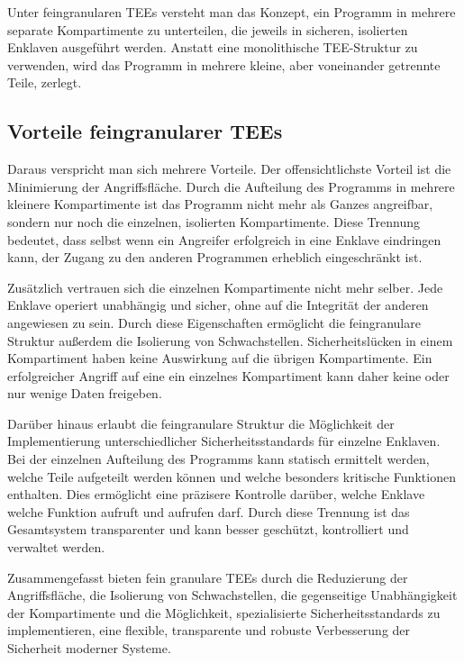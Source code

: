 Unter feingranularen TEEs versteht man das Konzept, ein Programm in mehrere separate Kompartimente zu unterteilen, die jeweils in sicheren, isolierten Enklaven ausgeführt werden. Anstatt eine monolithische TEE-Struktur zu verwenden, wird das Programm in mehrere kleine, aber voneinander getrennte Teile, zerlegt.

\subsection{Vorteile feingranularer TEEs}

Daraus verspricht man sich mehrere Vorteile. Der offensichtlichste Vorteil ist die Minimierung der Angriffsfläche. Durch die Aufteilung des Programms in mehrere kleinere Kompartimente ist das Programm nicht mehr als Ganzes angreifbar, sondern nur noch die einzelnen, isolierten Kompartimente. Diese Trennung bedeutet, dass selbst wenn ein Angreifer erfolgreich in eine Enklave eindringen kann, der Zugang zu den anderen Programmen erheblich eingeschränkt ist. 

Zusätzlich vertrauen sich die einzelnen Kompartimente nicht mehr selber. Jede Enklave operiert unabhängig und sicher, ohne auf die Integrität der anderen angewiesen zu sein. Durch diese Eigenschaften ermöglicht die feingranulare Struktur außerdem die Isolierung von Schwachstellen. Sicherheitslücken in einem Kompartiment haben keine Auswirkung auf die übrigen Kompartimente. Ein erfolgreicher Angriff auf eine ein einzelnes Kompartiment kann daher keine oder nur wenige Daten freigeben.

Darüber hinaus erlaubt die feingranulare Struktur die Möglichkeit der Implementierung unterschiedlicher Sicherheitsstandards für einzelne Enklaven. Bei der einzelnen Aufteilung des Programms kann statisch ermittelt werden, welche Teile aufgeteilt werden können und welche besonders kritische Funktionen enthalten. Dies ermöglicht eine präzisere Kontrolle darüber, welche Enklave welche Funktion aufruft und aufrufen darf. Durch diese Trennung ist das Gesamtsystem transparenter und kann besser geschützt, kontrolliert und verwaltet werden.

Zusammengefasst bieten fein granulare TEEs durch die Reduzierung der Angriffsfläche, die Isolierung von Schwachstellen, die gegenseitige Unabhängigkeit der Kompartimente und die Möglichkeit, spezialisierte Sicherheitsstandards zu implementieren, eine flexible, transparente und robuste Verbesserung der Sicherheit moderner Systeme.